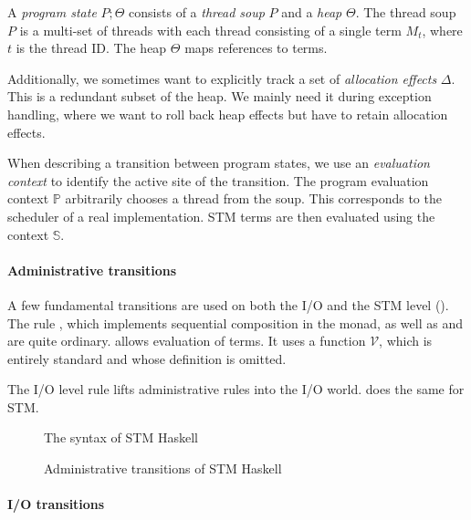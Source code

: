 A \emph{program state} $P;\Theta$ consists of a \emph{thread soup} $P$ and a \emph{heap} $\Theta$.
The thread soup $P$ is a multi-set of threads with each thread consisting of a single term $M_t$, where $t$ is the thread ID.
The heap $\Theta$ maps references to terms.

Additionally, we sometimes want to explicitly track a set of \emph{allocation effects} $\Delta$.
This is a redundant subset of the heap.
We mainly need it during exception handling, where we want to roll back heap effects but have to retain allocation effects.

When describing a transition between program states, we use an \emph{evaluation context} to identify the active site of the transition.
The program evaluation context $\mathbb{P}$ arbitrarily chooses a thread from the soup.
This corresponds to the scheduler of a real implementation.
STM terms are then evaluated using the context $\mathbb{S}$.

\paragraph{Administrative transitions}

A few fundamental transitions are used on both the I/O and the STM level ().
The rule , which implements sequential composition in the monad, as well as  and  are quite ordinary.
 allows evaluation of terms.
It uses a function $\mathcal{V}$, which is entirely standard and whose definition is omitted.

The I/O level rule  lifts administrative rules into the I/O world.  does the same for STM.

\begin{figure}[p]

\caption{The syntax of STM Haskell \parencite{harris-et-al-2005}}
\label{fig:orig-syntax}
\end{figure}

\begin{figure}[p]

\caption{Administrative transitions of STM Haskell \parencite{harris-et-al-2005}}
\label{fig:orig-admin}
\end{figure}


\clearpage

\paragraph{I/O transitions}


